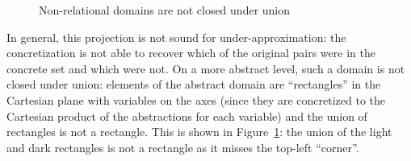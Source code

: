 \begin{example}
	\begin{figure}[t]
		\centering
		{
			\fontsize{11pt}{13pt}\selectfont
			\def\svgwidth{3in}
			
		}
		\caption{Non-relational domains are not closed under union}
		\label{fig:uai:rel-domain}
	\end{figure}
	In general, this projection is not sound for under-approximation: the concretization is not able to recover which of the original pairs were in the concrete set and which were not. On a more abstract level, such a domain is not closed under union: elements of the abstract domain are ``rectangles'' in the Cartesian plane with variables on the axes (since they are concretized to the Cartesian product of the abstractions for each variable) and the union of rectangles is not a rectangle. This is shown in Figure~\ref{fig:uai:rel-domain}: the union of the light and dark rectangles is not a rectangle as it misses the top-left ``corner''.
\end{example}

